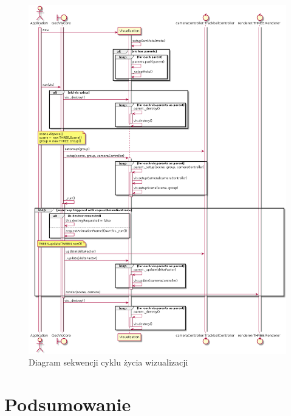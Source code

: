 \begin{figure}
    \centering
    \includegraphics[width=\textwidth]{diagrams/out/c3_lifecycle_seq.png}
    \caption{Diagram sekwencji cyklu życia wizualizacji}
    \label{fig:c3_lifecycle_seq}
\end{figure}

\section{Podsumowanie}